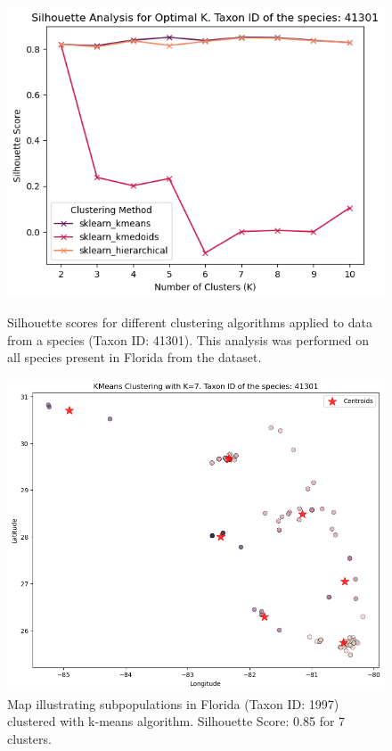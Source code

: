 \documentclass{article}
\begin{document}
\begin{figure}[h!]
    \begin{minipage}{0.49\textwidth}
        \includegraphics[width=\textwidth]{figures/sil_score.png}
        \caption{Silhouette scores for different clustering algorithms applied to data from a species (Taxon ID: 41301). This analysis was performed on all species present in Florida from the dataset.}
        \label{fig:sil_score}
    \end{minipage}\hfill
    \begin{minipage}{0.49\textwidth}
        \includegraphics[width=\textwidth]{figures/cluster_map.png}
        \caption{Map illustrating subpopulations in Florida (Taxon ID: 1997) clustered with k-means algorithm. Silhouette Score: 0.85 for 7 clusters.}
        \label{fig:cluster_map}
    \end{minipage}\hfill
\end{figure}
\end{document}
